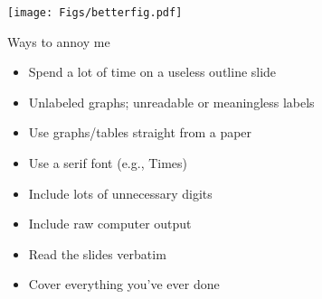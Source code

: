 \documentclass[12pt]{article}
\newcommand{\headsize}{\fontsize{35}{35} \selectfont}
\newcommand{\smallsize}{\fontsize{25}{30} \selectfont}
\begin{document}
\vspace{30mm} \color{mywhite} \smallsize

\centerline{\texttt{[image: Figs/betterfig.pdf]}}



\newpage

\headsize \color{myyellow}
\hfill \begin{minipage}{5.75in}
\centering
Ways to annoy me
\end{minipage}

\vspace{30mm} \color{mywhite} \smallsize

\hfill \begin{minipage}{9.5in}

\begin{itemize}
\itemsep18pt
\color{myblue}
\item Spend a lot of time on a useless outline slide

\item Unlabeled graphs; unreadable or meaningless labels

\item Use graphs/tables straight from a paper
\color{mywhite}

\item Use a serif font (e.g., Times)

\color{myblue}
\item Include lots of unnecessary digits

\item Include raw computer output

\item Read the slides verbatim

\item Cover everything you've ever done

\end{itemize}

\end{minipage}


\newpage
\end{document}

